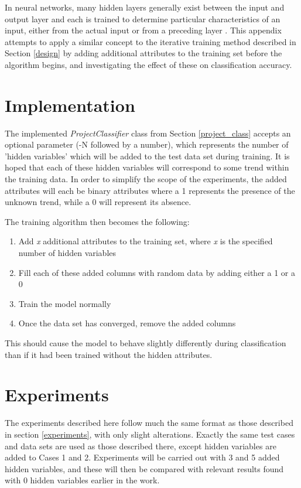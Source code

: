 
In neural networks, many hidden layers generally exist between the input and output layer and each is trained to determine particular characteristics of an input, either from the actual input or from a preceding layer \cite{stackexchange_nn}. This appendix attempts to apply a similar concept to the iterative training method described in Section \ref{design} by adding additional attributes to the training set before the algorithm begins, and investigating the effect of these on classification accuracy.

\section{Implementation}

The implemented \textit{ProjectClassifier} class from Section \ref{project_class} accepts an optional parameter (-N followed by a number), which represents the number of 'hidden variables' which will be added to the test data set during training. It is hoped that each of these hidden variables will correspond to some trend within the training data. In order to simplify the scope of the experiments, the added attributes will each be binary attributes where a 1 represents the presence of the unknown trend, while a 0 will represent its absence. 

The training algorithm then becomes the following:

\begin{enumerate}
\item Add \textit{x} additional attributes to the training set, where \textit{x} is the specified number of hidden variables
\item Fill each of these added columns with random data by adding either a 1 or a 0
\item Train the model normally
\item Once the data set has converged, remove the added columns
\end{enumerate}

This should cause the model to behave slightly differently during classification than if it had been trained without the hidden attributes.

\section{Experiments}

The experiments described here follow much the same format as those described in section \ref{experiments}, with only slight alterations. Exactly the same test cases and data sets are used as those described there, except hidden variables are added to Cases 1 and 2. Experiments will be carried out with 3 and 5 added hidden variables, and these will then be compared with relevant results found with 0 hidden variables earlier in the work.

